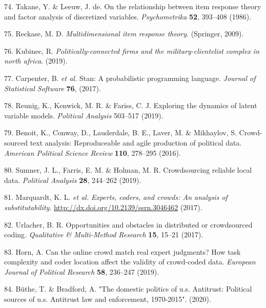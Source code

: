 \documentclass[]{article}
\begin{document}
\begin{cslreferences}
\leavevmode\hypertarget{ref-takane1986}{}%
74. Takane, Y. \& Leeuw, J. de. On the relationship between item response theory and factor analysis of discretized variables. \emph{Psychometrika} \textbf{52}, 393--408 (1986).

\leavevmode\hypertarget{ref-reckase2009}{}%
75. Reckase, M. D. \emph{Multidimensional item response theory}. (Springer, 2009).

\leavevmode\hypertarget{ref-kubinec2019}{}%
76. Kubinec, R. \emph{Politically-connected firms and the military-clientelist complex in north africa}. (2019).

\leavevmode\hypertarget{ref-carpenter2017}{}%
77. Carpenter, B. \emph{et al.} Stan: A probabilistic programming language. \emph{Journal of Statistical Software} \textbf{76}, (2017).

\leavevmode\hypertarget{ref-reunig2019}{}%
78. Reunig, K., Kenwick, M. R. \& Fariss, C. J. Exploring the dynamics of latent variable models. \emph{Political Analysis} 503--517 (2019).

\leavevmode\hypertarget{ref-benoitetal2016}{}%
79. Benoit, K., Conway, D., Lauderdale, B. E., Laver, M. \& Mikhaylov, S. Crowd-sourced text analysis: Reproduceable and agile production of political data. \emph{American Political Science Review} \textbf{110}, 278--295 (2016).

\leavevmode\hypertarget{ref-sumneretal2019}{}%
80. Sumner, J. L., Farris, E. M. \& Holman, M. R. Crowdsourcing reliable local data. \emph{Political Analysis} \textbf{28}, 244--262 (2019).

\leavevmode\hypertarget{ref-marquardtetal2017}{}%
81. Marquardt, K. L. \emph{et al.} \emph{Experts, coders, and crowds: An analysis of substitutability}. \url{http://dx.doi.org/10.2139/ssrn.3046462} (2017).

\leavevmode\hypertarget{ref-Urlacher2017}{}%
82. Urlacher, B. R. Opportunities and obstacles in distributed or crowdsourced coding. \emph{Qualitative \& Multi-Method Research} \textbf{15}, 15--21 (2017).

\leavevmode\hypertarget{ref-Horn2019}{}%
83. Horn, A. Can the online crowd match real expert judgments? How task complexity and coder location affect the validity of crowd-coded data. \emph{European Journal of Political Research} \textbf{58}, 236--247 (2019).

\leavevmode\hypertarget{ref-buthe2020}{}%
84. Büthe, T. \& Bradford, A. "The domestic politics of u.s. Antitrust: Political sources of u.s. Antitrust law and enforcement, 1970-2015". (2020).


\end{cslreferences}
\end{document}
